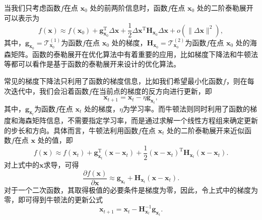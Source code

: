 当我们只考虑函数\( f \)在点 \( \bm{x}_0 \) 处的前两阶信息时，函数\( f \)在点 \( \bm{x}_0 \) 处的二阶泰勒展开可以表示为
\[
    f(\bm{x}) \approx f(\bm{x}_0) + \bm{g}^{\mathrm{T}}_{\bm{x}_0} \Delta \bm{x} + \frac{1}{2} \Delta \bm{x}^{\mathrm{T}} \mathbf{H}_{\bm{x}_0} \Delta \bm{x} + o(\|\Delta \bm{x}\|^2),
\]
其中，\( \bm{g}_{\bm{x}_0} = \mathcal{T}^{(1)}_{\bm{x}_0} \)为函数\(f\)在点 \( \bm{x}_0 \) 处的梯度，\( \mathbf{H}_{\bm{x}_0} = \mathcal{T}^{(2)}_{\bm{x}_0} \)为函数\(f\)在点 \( \bm{x}_0 \) 处的海森矩阵。函数的泰勒展开在优化算法中有着重要的应用，比如梯度下降法和牛顿法等都可以看作是基于函数的泰勒展开来设计的优化算法。

常见的梯度下降法只利用了函数的梯度信息，比如我们希望最小化函数\( f \)，则在每次迭代中，我们会沿着函数\( f \)在当前点的梯度的反方向进行更新，即
\[
    \bm{x}_{t+1} = \bm{x}_t - \eta \bm{g}_{\bm{x}_t},
\]
其中，\( \bm{g}_{\bm{x}_t} \)为函数\( f \)在点 \( \bm{x}_t \) 处的梯度，\( \eta \)为学习率。而牛顿法则同时利用了函数的梯度和海森矩阵信息，不需要指定学习率，而是通过求解一个线性方程组来确定更新的步长和方向。具体而言，牛顿法利用函数\( f \)在点 \( \bm{x}_t \) 处的二阶泰勒展开来近似函数\( f \)在点 \( \bm{x} \) 处的值，即
\[
    f(\bm{x}) \approx f(\bm{x}_t) + \bm{g}^{\mathrm{T}}_{\bm{x}_t} (\bm{x} - \bm{x}_t) + \frac{1}{2} (\bm{x} - \bm{x}_t)^{\mathrm{T}} \mathbf{H}_{\bm{x}_t} (\bm{x} - \bm{x}_t).
\]
对上式中的\( \bm{x} \)求导，可得
\[
    \frac{\partial f(\bm{x})}{\partial \bm{x}} \approx \bm{g}_{\bm{x}_t} + \mathbf{H}_{\bm{x}_t} (\bm{x} - \bm{x}_t).
\]
对于一个二次函数，其取得极值的必要条件是梯度为零，因此，令上式中的梯度为零，即可得到牛顿法的更新公式
\[
    \bm{x}_{t+1} = \bm{x}_t - \mathbf{H}_{\bm{x}_t}^{-1} \bm{g}_{\bm{x}_t}.
\]





